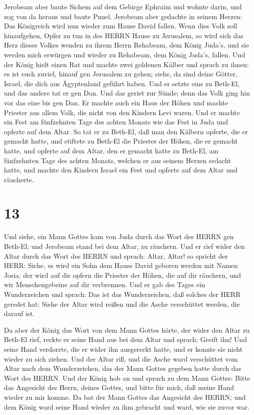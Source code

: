  Jerobeam aber baute Sichem auf dem Gebirge Ephraim und
wohnte darin, und zog von da heraus und baute Pnuel. 
Jerobeam aber gedachte in seinem Herzen: Das Königreich wird nun wieder
zum Hause David fallen.  Wenn dies Volk soll hinaufgehen,
Opfer zu tun in des HERRN Hause zu Jerusalem, so wird sich das Herz
dieses Volkes wenden zu ihrem Herrn Rehabeam, dem König Juda's, und sie
werden mich erwürgen und wieder zu Rehabeam, dem König Juda's, fallen.
 Und der König hielt einen Rat und machte zwei goldenen
Kälber und sprach zu ihnen: es ist euch zuviel, hinauf gen Jerusalem zu
gehen; siehe, da sind deine Götter, Israel, die dich aus Ägyptenland
geführt haben.  Und er setzte eins zu Beth-El, und das
andere tat er gen Dan.  Und das geriet zur Sünde; denn das
Volk ging hin vor das eine bis gen Dan.  Er machte auch ein
Haus der Höhen und machte Priester aus allem Volk, die nicht von den
Kindern Levi waren.  Und er machte ein Fest am fünfzehnten
Tage des achten Monats wie das Fest in Juda und opferte auf dem Altar.
So tat er zu Beth-El, daß man den Kälbern opferte, die er gemacht hatte,
und stiftete zu Beth-El die Priester der Höhen, die er gemacht hatte,
 und opferte auf dem Altar, den er gemacht hatte zu
Beth-El, am fünfzehnten Tage des achten Monats, welchen er aus seinem
Herzen erdacht hatte, und machte den Kindern Israel ein Fest und opferte
auf dem Altar und räucherte.

\hypertarget{section-12}{%
\section{13}\label{section-12}}

 Und siehe, ein Mann Gottes kam von Juda durch das Wort des
HERRN gen Beth-El; und Jerobeam stand bei dem Altar, zu räuchern.
 Und er rief wider den Altar durch das Wort des HERRN und
sprach: Altar, Altar! so spricht der HERR: Siehe, es wird ein Sohn dem
Hause David geboren werden mit Namen Josia; der wird auf dir opfern die
Priester der Höhen, die auf dir räuchern, und wir Menschengebeine auf
dir verbrennen.  Und er gab des Tages ein Wunderzeichen und
sprach: Das ist das Wunderzeichen, daß solches der HERR geredet hat:
Siehe der Altar wird reißen und die Asche verschüttet werden, die darauf
ist.

 Da aber der König das Wort von dem Mann Gottes hörte, der
wider den Altar zu Beth-El rief, reckte er seine Hand aus bei dem Altar
und sprach: Greift ihn! Und seine Hand verdorrte, die er wider ihn
ausgereckt hatte, und er konnte sie nicht wieder zu sich ziehen.
 Und der Altar riß, und die Asche ward verschüttet vom Altar
nach dem Wunderzeichen, das der Mann Gottes gegeben hatte durch das Wort
des HERRN.  Und der König hob an und sprach zu dem Mann
Gottes: Bitte das Angesicht des Herrn, deines Gottes, und bitte für
mich, daß meine Hand wieder zu mir komme. Da bat der Mann Gottes das
Angesicht des HERRN; und dem König ward seine Hand wieder zu ihm
gebracht und ward, wie sie zuvor war.

